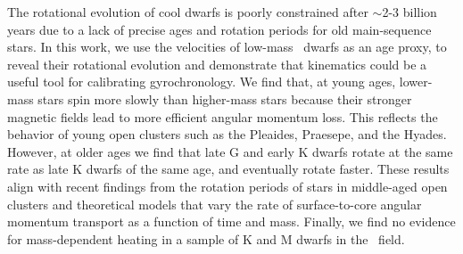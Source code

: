 
The rotational evolution of cool dwarfs is poorly constrained after $\sim$2-3
billion years due to a lack of precise ages and rotation periods for old
main-sequence stars.
In this work, we use the velocities of low-mass \kepler\ dwarfs as an age
proxy, to reveal their rotational evolution and demonstrate that kinematics
could be a useful tool for calibrating gyrochronology.
We find that, at young ages, lower-mass stars spin more slowly than
higher-mass stars because their stronger magnetic fields lead to more
efficient angular momentum loss.
This reflects the behavior of young open clusters such as the Pleaides,
Praesepe, and the Hyades.
However, at older ages we find that late G and early K dwarfs rotate at the
same rate as late K dwarfs of the same age, and eventually rotate faster.
These results align with recent findings from the rotation periods of stars in
middle-aged open clusters and theoretical models that vary the rate of
surface-to-core angular momentum transport as a function of time and mass.
Finally, we find no evidence for mass-dependent heating in a sample of K and M
dwarfs in the \kepler\ field.

